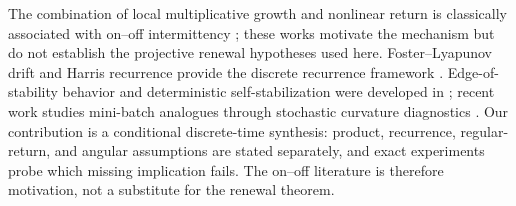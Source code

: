 \documentclass[10pt]{article}
\theoremstyle{definition}
\theoremstyle{remark}
\begin{document}
The combination of local multiplicative growth and nonlinear return is
classically associated with on--off intermittency
\cite{Platt1993,Heagy1994,OttSommerer1994}; these works motivate the mechanism
but do not establish the projective renewal hypotheses used here.
Foster--Lyapunov drift and Harris recurrence provide the discrete recurrence
framework \cite{MeynTweedie1992}.  Edge-of-stability behavior and deterministic
self-stabilization were developed in
\cite{Cohen2021,Damian2023,Zhu2023,Ghosh2025}; recent work studies mini-batch
analogues through stochastic curvature diagnostics
\cite{Andreyev2024,Liao2026}.  Our contribution is a conditional discrete-time
synthesis: product, recurrence, regular-return, and angular assumptions are
stated separately, and exact experiments probe which missing implication
fails.  The on--off literature is therefore motivation, not a substitute for
the renewal theorem.
\end{document}

